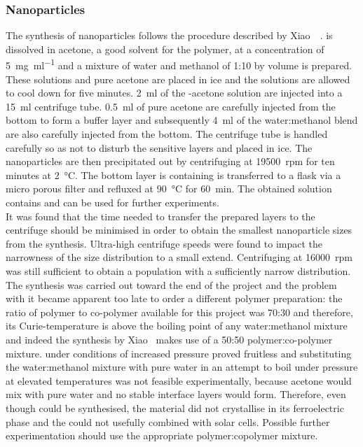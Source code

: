 \subsubsection{Nanoparticles}
The synthesis of \pvtr{} nanoparticles follows the procedure described by Xiao~\etal{}~\cite{NPsynthesis}. \pvtr{} is dissolved in acetone, a good solvent for the polymer, at a concentration of \SI{5}{\milli\gram\per\milli\litre} and a mixture of water and methanol of 1:10 by volume is prepared. These solutions and pure acetone are placed in ice and the solutions are allowed to cool down for five minutes. \SI{2}{\milli\litre} of the \pvtr{}-acetone solution are injected into a \SI{15}{\milli\litre} centrifuge tube. \SI{0.5}{\milli\litre} of pure acetone are carefully injected from the bottom to form a buffer layer and subsequently \SI{4}{\milli\litre} of the water:methanol blend are also carefully injected from the bottom. The centrifuge tube is handled carefully so as not to disturb the sensitive layers and placed in ice. The nanoparticles are then precipitated out by centrifuging at \SI{19500}{rpm} for ten minutes at \SI{2}{\degreeCelsius}. The bottom layer is containing \nps{} is transferred to a flask via a micro porous filter and refluxed at \SI{90}{\degreeCelsius} for \SI{60}{\minute}. The obtained solution contains \pvtr{} \nps{} and can be used for further experiments.\\
It was found that the time needed to transfer the prepared layers to the centrifuge should be minimised in order to obtain the smallest nanoparticle sizes from the synthesis. Ultra-high centrifuge speeds were found to impact the narrowness of the size distribution to a small extend. Centrifuging at \SI{16000}{rpm} was still sufficient to obtain a population with a sufficiently narrow distribution.\\
The synthesis was carried out toward the end of the project and the problem with it became apparent too late to order a different polymer preparation: the ratio of polymer to co-polymer available for this project was 70:30 and therefore, its Curie-temperature is above the boiling point of any water:methanol mixture and indeed the synthesis by Xiao~\etal{} makes use of a 50:50 polymer:co-polymer mixture.  under conditions of increased pressure proved fruitless and substituting the water:methanol mixture with pure water in an attempt to boil under pressure at elevated temperatures was not feasible experimentally, because acetone would mix with pure water and no stable interface layers would form. Therefore, even though \nps{} could be synthesised, the material did not crystallise in its ferroelectric phase and the \nps{} could not usefully combined with solar cells. Possible further experimentation should use the appropriate polymer:copolymer mixture.
